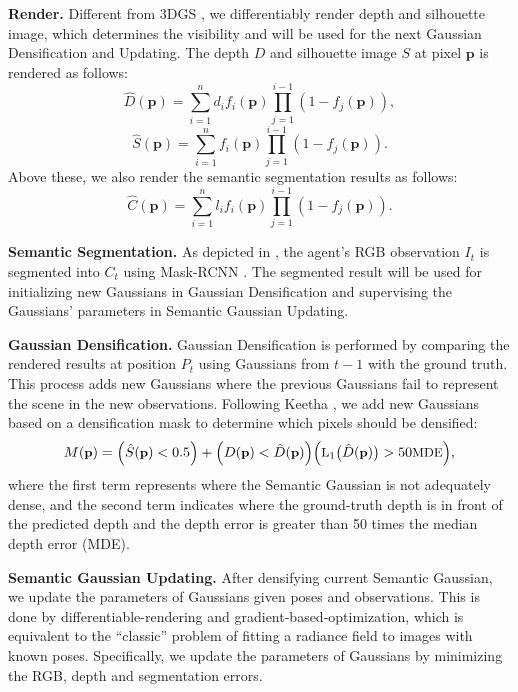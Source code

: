 \textbf{Render.} Different from 3DGS \cite{kerbl3Dgaussians}, we differentiably render depth and silhouette image, which determines the visibility and will be used for the next Gaussian Densification and Updating. The depth $D$ and silhouette image $S$ at pixel $\mathbf{p}$ is rendered as follows:
\begin{equation}
    \hat{D}(\mathbf{p}) = \sum_{i=1}^{n} d_i f_i(\mathbf{p}) \prod_{j=1}^{i-1} (1 - f_j(\mathbf{p})), 
\end{equation}
\begin{equation}
    \hat{S}(\mathbf{p}) = \sum_{i=1}^{n} f_i(\mathbf{p}) \prod_{j=1}^{i-1} (1 - f_j(\mathbf{p})).
\end{equation}
Above these, we also render the semantic segmentation results as follows:
\begin{equation}
    \hat{C}(\mathbf{p}) = \sum_{i=1}^{n} l_i f_i(\mathbf{p}) \prod_{j=1}^{i-1} (1 - f_j(\mathbf{p})).
\end{equation}

\textbf{Semantic Segmentation.} As depicted in , the agent's RGB observation $I_t$ is segmented into $C_t$ using Mask-RCNN \cite{he2017mask}. The segmented result will be used for initializing new Gaussians in Gaussian Densification and supervising the Gaussians' parameters in Semantic Gaussian Updating. 


\textbf{Gaussian Densification.} Gaussian Densification is performed by comparing the rendered results at position $P_t$ using Gaussians from $t-1$ with the ground truth. This process adds new Gaussians where the previous Gaussians fail to represent the scene in the new observations. Following Keetha \etal \cite{keetha2023splatam}, we add new Gaussians based on a densification mask to determine which pixels should be densified:
\begin{equation}
\small
M(\textbf{p}) = \Bigl(\hat{S}(\textbf{p}) < 0.5\Bigr) + \Bigl( D(\textbf{p}) < \hat{D}(\textbf{p}) \Bigr) \Bigl(\textrm{L}_1\bigl(\hat{D}(\textbf{p})\bigr) > 50 \textrm{MDE} \Bigr),
\end{equation}
where the first term represents where the Semantic Gaussian is not adequately dense, and the second term indicates where the ground-truth depth is in front of the predicted depth and the depth error is greater than 50 times the median depth error (MDE).

\textbf{Semantic Gaussian Updating.}  After densifying current Semantic Gaussian, we update the parameters of Gaussians given poses and observations. This is done by differentiable-rendering and gradient-based-optimization, which is equivalent to the ``classic'' problem of fitting a radiance field to images with known poses. Specifically, we update the parameters of Gaussians by minimizing the RGB, depth and segmentation errors.



